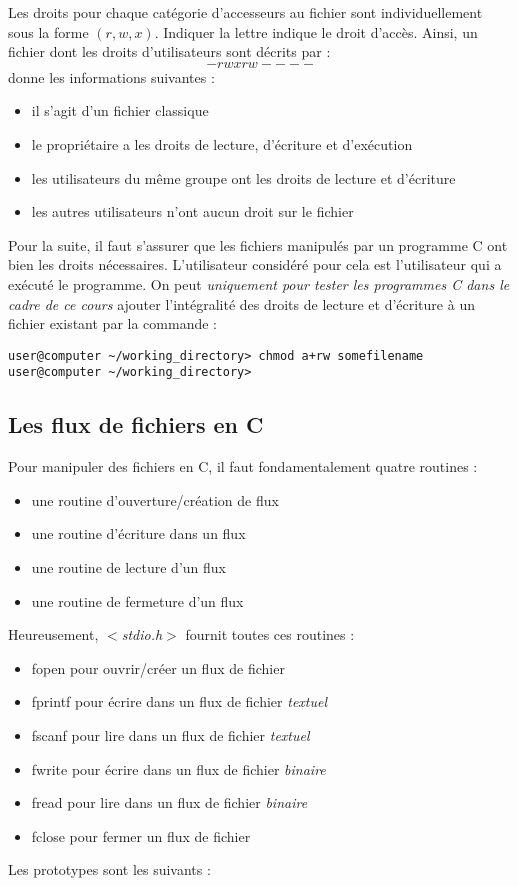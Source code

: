 \documentclass[../../../main.tex]{subfiles}
\begin{document}
Les droits pour chaque catégorie d'accesseurs au fichier sont individuellement sous la forme $(r, w, x)$. Indiquer la lettre indique le droit d'accès. Ainsi, un fichier dont les droits d'utilisateurs sont décrits par :
$$-rwxrw----$$
donne les informations suivantes :
\begin{itemize}
	\item il s'agit d'un fichier classique
	\item le propriétaire a les droits de lecture, d'écriture et d'exécution
	\item les utilisateurs du même groupe ont les droits de lecture et d'écriture
	\item les autres utilisateurs n'ont aucun droit sur le fichier
\end{itemize}
Pour la suite, il faut s'assurer que les fichiers manipulés par un programme C ont bien les droits nécessaires. L'utilisateur considéré pour cela est l'utilisateur qui a exécuté le programme. On peut \textit{uniquement pour tester les programmes C dans le cadre de ce cours} ajouter l'intégralité des droits de lecture et d'écriture à un fichier existant par la commande :
\begin{verbatim}
user@computer ~/working_directory> chmod a+rw somefilename
user@computer ~/working_directory>
\end{verbatim}
\subsection{Les flux de fichiers en C}
\label{sub:les_flux_de_fichiers_en_c}
Pour manipuler des fichiers en C, il faut fondamentalement quatre routines :
\begin{itemize}
	\item une routine d'ouverture/création de flux
	\item une routine d'écriture dans un flux
	\item une routine de lecture d'un flux
	\item une routine de fermeture d'un flux
\end{itemize}
Heureusement, \textit{$<$stdio.h$>$} fournit toutes ces routines :
\begin{itemize}
	\item \textsf{fopen} pour ouvrir/créer un flux de fichier
	\item \textsf{fprintf} pour écrire dans un flux de fichier \textit{textuel}
	\item \textsf{fscanf} pour lire dans un flux de fichier \textit{textuel}
	\item \textsf{fwrite} pour écrire dans un flux de fichier \textit{binaire}
	\item \textsf{fread} pour lire dans un flux de fichier \textit{binaire}
	\item \textsf{fclose} pour fermer un flux de fichier
\end{itemize}
Les prototypes sont les suivants :
\end{document}
